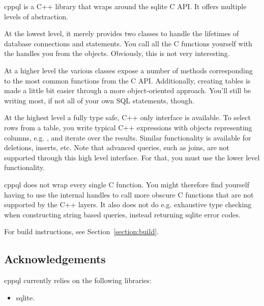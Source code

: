 \gls{cppql} is a C++ library that wraps around the \gls{sqlite} C API. It offers multiple levels of abstraction.

At the lowest level, it merely provides two classes to handle the lifetimes of database connections and \gls{statement}s. You call all the C functions yourself with the handles you  from the objects. Obviously, this is not very interesting.

At a higher level the various classes expose a number of methods corresponding to the most common functions from the C API. Additionally, creating tables is made a little bit easier through a more object-oriented approach. You'll still be writing most, if not all of your own SQL statements, though.

At the highest level a fully type safe, C++ only interface is available. To select rows from a table, you write typical C++ expressions with objects representing columns, e.g. , and iterate over the results. Similar functionality is available for deletions, inserts, etc. Note that advanced queries, such as joins, are not supported through this high level interface. For that, you must use the lower level functionality.

\gls{cppql} does not wrap every single C function. You might therefore find yourself having to use the internal handles to call more obscure C functions that are not supported by the C++ layers. It also does not do e.g. exhaustive type checking when constructing string based queries, instead returning \gls{sqlite} error codes.

For build instructions, see Section~\ref{section:build}.

\subsection{Acknowledgements}
\label{section:introduction:acknowledgements}

\gls{cppql} currently relies on the following libraries:
\begin{itemize}
	\item {} \gls{sqlite}\cite{sqlite}.
\end{itemize}